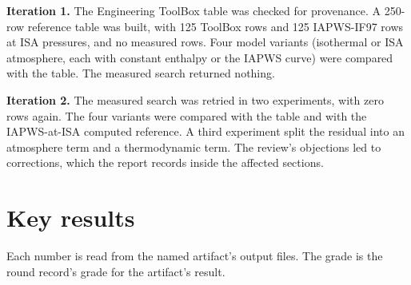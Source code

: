 \documentclass[11pt,letterpaper]{article}
\begin{document}
\textbf{Iteration 1.} The Engineering ToolBox table was checked for provenance. A 250-row reference table was built, with 125 ToolBox rows and 125 IAPWS-IF97 rows at ISA pressures, and no measured rows. Four model variants (isothermal or ISA atmosphere, each with constant enthalpy or the IAPWS curve) were compared with the table. The measured search returned nothing.

\textbf{Iteration 2.} The measured search was retried in two experiments, with zero rows again. The four variants were compared with the table and with the IAPWS-at-ISA computed reference. A third experiment split the residual into an atmosphere term and a thermodynamic term. The review's objections led to corrections, which the report records inside the affected sections.

\section{Key results}

Each number is read from the named artifact's output files. The grade is the round record's grade for the artifact's result.
\end{document}
